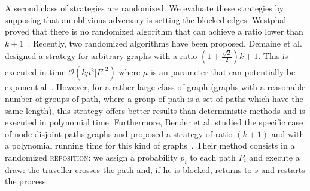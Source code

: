 \documentclass[a4paper, 10pt]{article}
\newcommand{\card}[1]{\left| #1 \right|}
\newcommand{\stpaths}{$(s,t)$-paths}
\newcommand{\mcalp}{\mathcal{P}}
\begin{document}
A second class of strategies are randomized. We evaluate these strategies by supposing that an oblivious adversary is setting the blocked edges. Westphal proved that there is no randomized algorithm that can achieve a ratio lower than $k+1$~\cite{We08}. Recently, two randomized algorithms have been proposed. Demaine et al. designed a strategy for arbitrary graphs with a ratio $\left(1+\frac{\sqrt{2}}{2}\right)k+1$. This is executed in time $\mathcal{O}\left(k\mu^2\card{E}^2\right)$ where $\mu$ is an parameter that can potentially be exponential~\cite{DeHuLiSa14}. However, for a rather large class of graph (graphs with a reasonable number of groups of path, where a group of path is a set of paths which have the same length), this strategy offers better results than deterministic methods and is executed in polynomial time. Furthermore, Bender et al. studied the specific case of node-disjoint-paths graphs and proposed a strategy of ratio $\left(k+1\right)$ and with a polynomial running time for this kind of graphs~\cite{BeWe15}. Their method consists in a randomized \textsc{reposition}: we assign a probability $p_i$ to each path $P_i$ and execute a draw: the traveller crosses the path and, if he is blocked, returns to $s$ and restarts the process.

\end{document}
